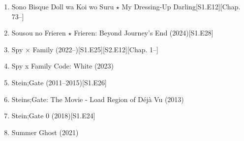 \documentclass{article}
\begin{document}
\begin{enumerate}
    \item Sono Bisque Doll wa Koi wo Suru $\star$ My Dressing-Up Darling\hfill[S1.E12][Chap. 73--]
    \item {\sc Sousou no Frieren $\star$ Frieren: Beyond Journey's End} (2024)\hfill[S1.E28]
    \item {\sc Spy $\times$ Family} (2022--)\hfill[S1.E25][S2.E12][Chap. 1--]
    \item {\sc Spy x Family Code: White} (2023)
    \item {\sc Stein;Gate} (2011--2015)\hfill[S1.E26]
    \item {\sc Steins;Gate: The Movie - Load Region of Déjà Vu} (2013)
    \item {\sc Stein;Gate 0} (2018)\hfill[S1.E24]
    \item {\sc Summer Ghost} (2021)
    

\end{enumerate}
\end{document}
